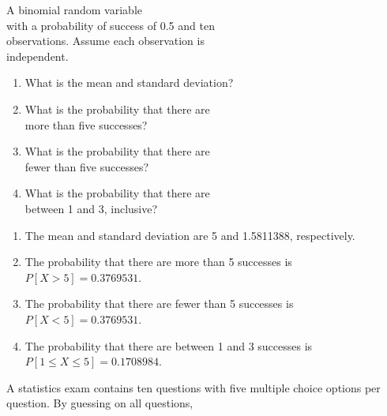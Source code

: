 \documentclass[11pt, chapterprefix=true]{scrbook}\usepackage[]{graphicx}\usepackage[]{color}
\begin{document}
\begin{exercises}
  \begin{exercise} %

A binomial random variable \\ with a probability of success of 0.5 and ten \\ observations. Assume each observation is \\ independent.

	  \begin{enumerate}
	  \item What is the mean and standard deviation?
    \item What is the probability that there are \\ more than five successes?
    \item What is the probability that there are \\ fewer than five successes?
    \item What is the probability that there are \\ between 1 and 3, inclusive?
	  \end{enumerate}

	\end{exercise}
	\begin{solution}  %


		\begin{enumerate}
	  \item The mean and standard deviation are 5 and 1.5811388, respectively.
    \item The probability that there are more than 5 successes is $P[ X > 5 ] = 0.3769531$.
    \item The probability that there are fewer than 5 successes is $P[ X < 5 ] = 0.3769531$.
    \item The probability that there  are between 1 and 3 successes  is $P[ 1 \le X \le 5 ] = 0.1708984$.
	  \end{enumerate}
	\end{solution}

  \begin{exercise} %

A statistics exam contains ten questions with five multiple choice options per question. By guessing on all questions,


\end{exercise}
\end{exercises}
\end{document}
